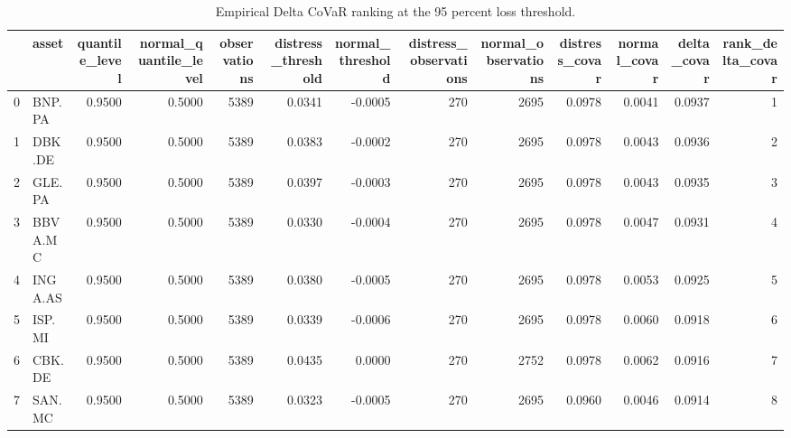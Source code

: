 \begin{table}
\caption{Empirical Delta CoVaR ranking at the 95 percent loss threshold.}
\label{tab:covar_empirical_ranked_q95}
\begin{tabular}{llrrrrrrrrrrr}
\toprule
 & asset & quantile_level & normal_quantile_level & observations & distress_threshold & normal_threshold & distress_observations & normal_observations & distress_covar & normal_covar & delta_covar & rank_delta_covar \\
\midrule
0 & BNP.PA & 0.9500 & 0.5000 & 5389 & 0.0341 & -0.0005 & 270 & 2695 & 0.0978 & 0.0041 & 0.0937 & 1 \\
1 & DBK.DE & 0.9500 & 0.5000 & 5389 & 0.0383 & -0.0002 & 270 & 2695 & 0.0978 & 0.0043 & 0.0936 & 2 \\
2 & GLE.PA & 0.9500 & 0.5000 & 5389 & 0.0397 & -0.0003 & 270 & 2695 & 0.0978 & 0.0043 & 0.0935 & 3 \\
3 & BBVA.MC & 0.9500 & 0.5000 & 5389 & 0.0330 & -0.0004 & 270 & 2695 & 0.0978 & 0.0047 & 0.0931 & 4 \\
4 & INGA.AS & 0.9500 & 0.5000 & 5389 & 0.0380 & -0.0005 & 270 & 2695 & 0.0978 & 0.0053 & 0.0925 & 5 \\
5 & ISP.MI & 0.9500 & 0.5000 & 5389 & 0.0339 & -0.0006 & 270 & 2695 & 0.0978 & 0.0060 & 0.0918 & 6 \\
6 & CBK.DE & 0.9500 & 0.5000 & 5389 & 0.0435 & 0.0000 & 270 & 2752 & 0.0978 & 0.0062 & 0.0916 & 7 \\
7 & SAN.MC & 0.9500 & 0.5000 & 5389 & 0.0323 & -0.0005 & 270 & 2695 & 0.0960 & 0.0046 & 0.0914 & 8 \\
\bottomrule
\end{tabular}
\end{table}
